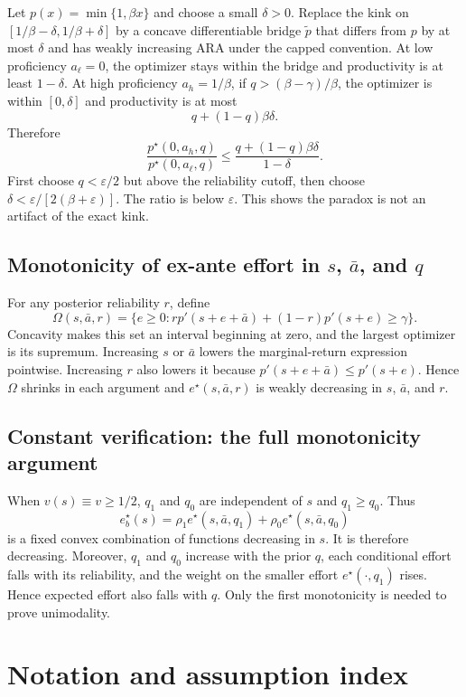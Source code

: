 \documentclass[11pt]{article}
\theoremstyle{tutorial}
\theoremstyle{remark}
\newcommand{\1}{\mathbb{I}}
\begin{document}
Let $p(x)=\min\{1,\beta x\}$ and choose a small $\delta>0$.  Replace the kink on
$[1/\beta-\delta,1/\beta+\delta]$ by a concave differentiable bridge $\tilde p$ that differs from $p$ by at
most $\delta$ and has weakly increasing ARA under the capped convention.  At low proficiency $a_\ell=0$,
the optimizer stays within the bridge and productivity is at least $1-\delta$.  At high proficiency
$a_h=1/\beta$, if $q>(\beta-\gamma)/\beta$, the optimizer is within $[0,\delta]$ and productivity is at most
\[
q+(1-q)\beta\delta.
\]
Therefore
\[
\frac{p^\star(0,a_h,q)}{p^\star(0,a_\ell,q)}
\le\frac{q+(1-q)\beta\delta}{1-\delta}.
\]
First choose $q<\varepsilon/2$ but above the reliability cutoff, then choose
$\delta<\varepsilon/[2(\beta+\varepsilon)]$.  The ratio is below $\varepsilon$.  This shows the paradox is
not an artifact of the exact kink.

\subsection{Monotonicity of ex-ante effort in $s$, $\bar a$, and $q$}

For any posterior reliability $r$, define
\[
\Omega(s,\bar a,r)=\{e\ge0:r p'(s+e+\bar a)+(1-r)p'(s+e)\ge\gamma\}.
\]
Concavity makes this set an interval beginning at zero, and the largest optimizer is its supremum.  Increasing
$s$ or $\bar a$ lowers the marginal-return expression pointwise.  Increasing $r$ also lowers it because
$p'(s+e+\bar a)\le p'(s+e)$.  Hence $\Omega$ shrinks in each argument and
$e^\star(s,\bar a,r)$ is weakly decreasing in $s$, $\bar a$, and $r$.

\subsection{Constant verification: the full monotonicity argument}

When $v(s)\equiv v\ge1/2$, $q_1$ and $q_0$ are independent of $s$ and $q_1\ge q_0$.  Thus
\[
e_b^\star(s)=\rho_1 e^\star(s,\bar a,q_1)+\rho_0 e^\star(s,\bar a,q_0)
\]
is a fixed convex combination of functions decreasing in $s$.  It is therefore decreasing.  Moreover,
$q_1$ and $q_0$ increase with the prior $q$, each conditional effort falls with its reliability, and the weight
on the smaller effort $e^\star(\cdot,q_1)$ rises.  Hence expected effort also falls with $q$.  Only the first
monotonicity is needed to prove unimodality.

\section{Notation and assumption index}
\end{document}
